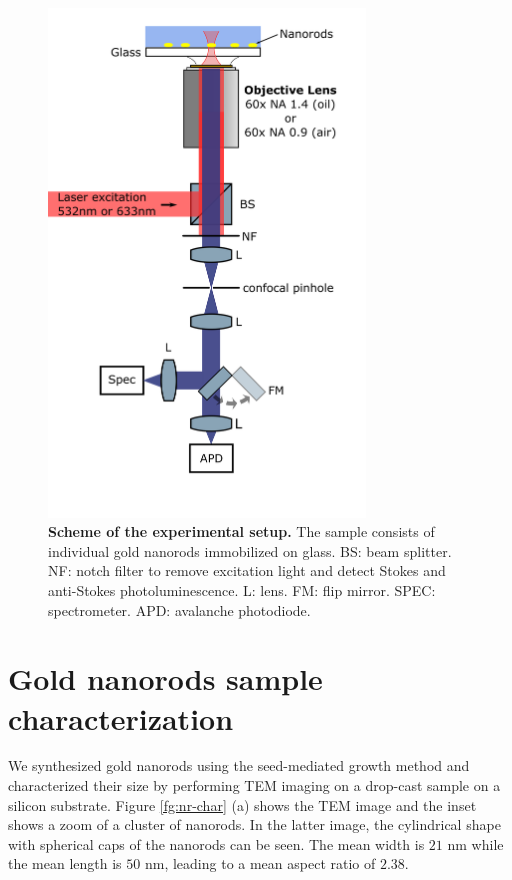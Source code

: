 \documentclass[journal=nalefd,manuscript=letter]{achemso}
\begin{document}
\begin{figure}[htp] \centering
\includegraphics[width=0.75\textwidth]{Figures/Supplementary/02_Setup/setup.png}
\caption{\textbf{Scheme of the experimental setup.} The sample consists of individual gold nanorods immobilized on glass. BS: beam splitter. NF: notch filter to remove excitation light and detect Stokes and anti-Stokes photoluminescence. L: lens. FM: flip mirror. SPEC: spectrometer. APD: avalanche photodiode.}
	\label{fig:setup}
\end{figure}

\pagebreak

\section{Gold nanorods sample characterization}

We synthesized gold nanorods using the seed-mediated growth method \cite{nikoobakht2003preparation} 
and characterized their size by performing TEM imaging on a drop-cast sample on a silicon substrate. 
Figure \ref{fg:nr-char} (a) shows the TEM image and the inset shows a zoom of a cluster of nanorods.
In the latter image, the cylindrical shape with spherical caps of the nanorods can be seen. 
The mean width is $21$ nm while the mean length is $50$ nm, leading to a mean aspect ratio of $2.38$. 
\end{document}

